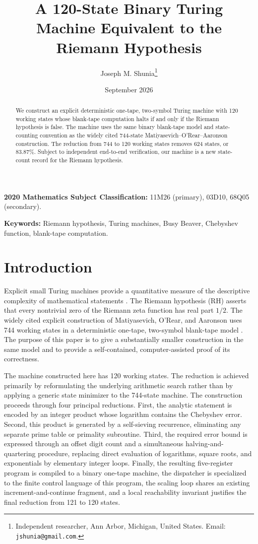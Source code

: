 \documentclass[10pt]{article}
\title{A 120-State Binary Turing Machine Equivalent to the Riemann Hypothesis}
\author{Joseph M. Shunia\thanks{Independent researcher, Ann Arbor, Michigan, United States. Email: \texttt{jshunia@gmail.com}.}}
\date{September 2026}
\theoremstyle{definition}
\begin{document}
\maketitle

\begin{abstract} \noindent
We construct an explicit deterministic one-tape, two-symbol Turing machine
with 120 working states whose blank-tape computation halts if and only if the
Riemann hypothesis is false. The machine uses the same binary blank-tape model
and state-counting convention as the widely cited 744-state
Matiyasevich--O'Rear--Aaronson construction. The reduction from 744 to 120 working
states removes 624 states, or 83.87\%. Subject to independent end-to-end
verification, our machine is a new state-count record for the Riemann
hypothesis.
\end{abstract}

\begingroup\small
\noindent\textbf{2020 Mathematics Subject Classification:}
11M26 (primary), 03D10, 68Q05 (secondary).\par
\noindent\textbf{Keywords:} Riemann hypothesis, Turing machines,
Busy Beaver, Chebyshev function, blank-tape computation.\par
\endgroup

\section{Introduction}
\label{sec:intro}

Explicit small Turing machines provide a quantitative measure of the
descriptive complexity of mathematical statements \cite{Aaronson}. The
Riemann hypothesis (RH) asserts that every nontrivial zero of the Riemann
zeta function has real part $1/2$. The widely cited explicit construction of Matiyasevich,
O'Rear, and Aaronson uses 744 working states in a deterministic one-tape,
two-symbol blank-tape model \cite{Aaronson,RH744Repo,BBCryptids}. The
purpose of this paper is to give a substantially smaller construction in
the same model and to provide a self-contained, computer-assisted proof of
its correctness.

The machine constructed here has 120 working states. The reduction is achieved
primarily by reformulating the underlying arithmetic search rather than by
applying a generic state minimizer to the 744-state machine. The construction
proceeds through four principal reductions. First, the analytic statement is
encoded by an integer product whose logarithm contains the Chebyshev error.
Second, this product is generated by a self-sieving recurrence, eliminating
any separate prime table or primality subroutine. Third, the required error
bound is expressed through an offset digit count and a simultaneous
halving-and-quartering procedure, replacing direct evaluation of logarithms,
square roots, and exponentials by elementary integer loops. Finally, the
resulting five-register program is compiled to a binary one-tape machine, the
dispatcher is specialized to the finite control language of this program, the scaling loop shares an existing increment-and-continue fragment, and
a local reachability invariant justifies the final reduction from 121 to 120
states.
\end{document}
